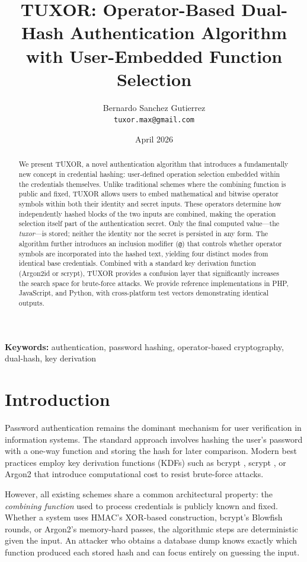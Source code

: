 \documentclass[11pt,a4paper]{article}
\title{
  \textbf{TUXOR: Operator-Based Dual-Hash Authentication Algorithm\\with User-Embedded Function Selection}
}
\author{
  Bernardo Sanchez Gutierrez\\
  \texttt{tuxor.max@gmail.com}
}
\date{April 2026}
\begin{document}
\maketitle

\begin{abstract}
We present TUXOR, a novel authentication algorithm that introduces a fundamentally new concept in credential hashing: user-defined operation selection embedded within the credentials themselves. Unlike traditional schemes where the combining function is public and fixed, TUXOR allows users to embed mathematical and bitwise operator symbols within both their identity and secret inputs. These operators determine how independently hashed blocks of the two inputs are combined, making the operation selection itself part of the authentication secret. Only the final computed value---the \textit{tuxor}---is stored; neither the identity nor the secret is persisted in any form. The algorithm further introduces an inclusion modifier (\texttt{@}) that controls whether operator symbols are incorporated into the hashed text, yielding four distinct modes from identical base credentials. Combined with a standard key derivation function (Argon2id or scrypt), TUXOR provides a confusion layer that significantly increases the search space for brute-force attacks. We provide reference implementations in PHP, JavaScript, and Python, with cross-platform test vectors demonstrating identical outputs.
\end{abstract}

\textbf{Keywords:} authentication, password hashing, operator-based cryptography, dual-hash, key derivation

\section{Introduction}

Password authentication remains the dominant mechanism for user verification in information systems. The standard approach involves hashing the user's password with a one-way function and storing the hash for later comparison. Modern best practices employ key derivation functions (KDFs) such as bcrypt \cite{provos1999bcrypt}, scrypt \cite{percival2009scrypt}, or Argon2 \cite{biryukov2016argon2} that introduce computational cost to resist brute-force attacks.

However, all existing schemes share a common architectural property: the \textit{combining function} used to process credentials is publicly known and fixed. Whether a system uses HMAC's XOR-based construction, bcrypt's Blowfish rounds, or Argon2's memory-hard passes, the algorithmic steps are deterministic given the input. An attacker who obtains a database dump knows exactly which function produced each stored hash and can focus entirely on guessing the input.
\end{document}
